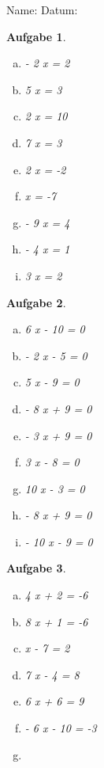 \documentclass[12pt]{article}
\theoremstyle{aufg}
\newtheorem{aufgabe}{Aufgabe}
\theoremstyle{bsp}
\begin{document}
 
    \begin{flushleft}
Name: \hspace{12cm} Datum:\begin{aufgabe} ~ \\ 
\begin{multicols}{3} 
\begin{enumerate}[a)] 
\item 
- 2 x = 2
\item 
5 x = 3
\item 
2 x = 10
\item 
7 x = 3
\item 
2 x = -2
\item 
x = -7
\item 
- 9 x = 4
\item 
- 4 x = 1
\item 
3 x = 2
\end{enumerate} 
\end{multicols} 
\end{aufgabe} 
\begin{aufgabe} ~ \\ 
\begin{multicols}{3} 
\begin{enumerate}[a)] 
\item 
6 x - 10 = 0
\item 
- 2 x - 5 = 0
\item 
5 x - 9 = 0
\item 
- 8 x + 9 = 0
\item 
- 3 x + 9 = 0
\item 
3 x - 8 = 0
\item 
10 x - 3 = 0
\item 
- 8 x + 9 = 0
\item 
- 10 x - 9 = 0
\end{enumerate} 
\end{multicols} 
\end{aufgabe} 
\begin{aufgabe} ~ \\ 
\begin{multicols}{3} 
\begin{enumerate}[a)] 
\item 
4 x + 2 = -6
\item 
8 x + 1 = -6
\item 
x - 7 = 2
\item 
7 x - 4 = 8
\item 
6 x + 6 = 9
\item 
- 6 x - 10 = -3
\item 

\end{enumerate}
\end{multicols}
\end{aufgabe}
\end{flushleft}
\end{document}
